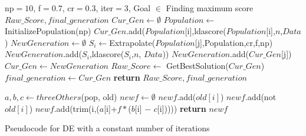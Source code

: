 \documentclass[10pt,conference]{IEEEtran}
\theoremstyle{break}
\begin{document}
\renewcommand{\algorithmicrequire}{\textbf{Input:}}
\renewcommand{\algorithmicensure}{\textbf{Output:}}
\begin{algorithm}
  
    \begin{algorithmic}[1]
    \Require np$=10$, f$=0.7$, cr$=0.3$, iter$=3$, Goal $\in$ Finding maximum score
    \Ensure $Raw\_Score, final\_generation$
        \State  $Cur\_Gen \leftarrow \emptyset$
        \State $Population \leftarrow $InitializePopulation(np)
            \State $Cur\_Gen$.add($Population$[i],ldascore($Population$[i],$n$,$Data$)
        \EndFor
            \State $NewGeneration \leftarrow \emptyset$
                \State $S_i \leftarrow $Extrapolate($Population$[j],Population,cr,f,np)
                    \State $NewGeneration$.add($S_i$,ldascore($S_i$,$n$, $Data$))
                \Else
                    \State $NewGeneration$.add($Cur\_Gen$[j])
                \EndIf
            \State  $Cur\_Gen \leftarrow NewGeneration$
            \EndFor
        \EndFor
        \State $Raw\_Score \leftarrow$ GetBestSolution($Cur\_Gen$)
        \State  $final\_generation \leftarrow Cur\_Gen$
        \State \textbf{return} $Raw\_Score, final\_generation$
    \EndFunction

        \State $a,b,c \leftarrow threeOthers$(pop, old)
        \State $newf \leftarrow \emptyset$
                \State $newf$.add($old[i]$)
            \Else
                    \State $newf$.add(not $old[i]$)
                \Else 
                    \State $newf$.add(trim(i,($a$[i]+$f\ast$($b$[i] $-$ $c$[i]))))
                \EndIf
            \EndIf
        \EndFor
        \State \textbf{return} $newf$ 
    \EndFunction
    \caption{Pseudocode for DE with a constant number of iterations}
    \end{algorithmic}
\end{algorithm}
\end{document}
